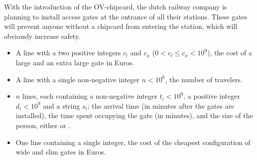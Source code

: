 
 



With the introduction of the OV-chipcard, the dutch railway company is planning to install access gates at the entrance of all their stations. These gates will prevent anyone without a chipcard from entering the station, which will obviously increase safety.



\Input
\begin{itemize}
 \item A line with a two positive integers $c_l$ and $c_x$ ($0 < c_l \le c_x < 10^9$), the cost of a large and an extra large
 gate in Euros.
 
 \item A line with a single non-negative integer $n < 10^6$, the number of travelers.
 
 \item $n$ lines, each containing a non-negative integer $t_i < 10^9$, a positive integer $d_i < 10^9$ and a string $s_i$; the arrival time (in minutes after the gates are installed), the time spent occupying the gate (in minutes), and the size of the person, either  or .
\end{itemize}

\Output
\begin{itemize}
 \item One line containing a single integer, the cost of the cheapest configuration of wide and slim gates in Euros.
\end{itemize}

\Example
